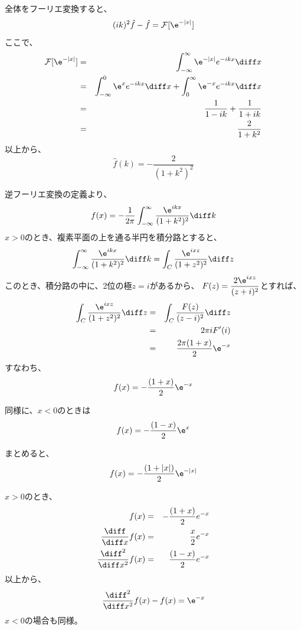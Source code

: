 
全体をフーリエ変換すると、
\begin{equation}
  (ik)^2 \hat{f} - \hat{f} = {\cal F}[\e^{-|x|}]
\end{equation}
ここで、
\begin{eqnarray}
  {\cal F}[\e^{-|x|}] & =&
  \int_{-\infty}^{\infty} \e^{-|x|} e^{-ikx} \diff x\\
  &=&
  \int_{-\infty}^{0} \e^{x} e^{-ikx} \diff x +
  \int_{0}^{\infty} \e^{-x} e^{-ikx} \diff x \\
  &=& \frac{1}{1-ik} + \frac{1}{1+ik}\\
  &=& \frac{2}{1+k^2}
\end{eqnarray}
以上から、
\begin{equation}
  \hat{f}(k) = - \frac{2}{(1+k^2)^2}
\end{equation}


逆フーリエ変換の定義より、
\begin{equation}
  f(x) = - \frac{1}{2\pi} \int_{-\infty}^{\infty}  \frac{\e^{ikx}}{(1+k^2)^2} \diff k
\end{equation}
$x>0$のとき、複素平面の上を通る半円を積分路とすると、
\begin{equation}
  \int_{-\infty}^{\infty}  \frac{\e^{ikx}}{(1+k^2)^2} \diff k
  = \int_C  \frac{\e^{ixz}}{(1+z^2)^2} \diff z
\end{equation}
このとき、積分路の中に、2位の極$z = i$があるから、
$F(z) = \displaystyle \frac{2 \e^{ixz}}{(z+i)^2}$とすれば、
\begin{eqnarray}
  \int_C  \frac{\e^{ixz}}{(1+z^2)^2} \diff z &=& \int_C  \frac{F(z)}{(z-i)^2} \diff z \\
  &=& 2 \pi i F'(i) \\
  &=& \frac{2\pi (1+x)}{2} \e^{-x}
\end{eqnarray}
すなわち、
\begin{equation}
  f(x) = - \frac{(1+x)}{2} \e^{-x}
\end{equation}

同様に、$x<0$のときは
\begin{equation}
  f(x) = - \frac{(1-x)}{2} \e^{x}
\end{equation}

まとめると、
\begin{equation}
  f(x) = - \frac{(1+|x|)}{2} \e^{-|x|}
\end{equation}


$x>0$のとき、
\begin{eqnarray}
  f(x) &=& -\frac{(1+x)}{2}e^{-x}\\
  \frac{\diff}{\diff x} f(x) &=& \frac{x}{2}e^{-x}\\
  \frac{\diff^2}{\diff x^2}  f(x) &=& \frac{(1-x)}{2}e^{-x}\\
\end{eqnarray}
以上から、
\begin{equation}
  \frac{\diff^2}{\diff x^2}  f(x) - f(x) = \e^{-x}
\end{equation}
$x<0$の場合も同様。

